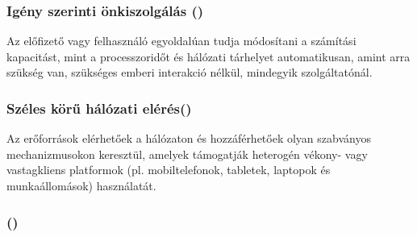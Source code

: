 \subsubsection{Igény szerinti önkiszolgálás ()}

Az előfizető vagy felhasználó egyoldalúan tudja módosítani a számítási kapacitást, mint a processzoridőt és hálózati tárhelyet automatikusan, amint arra szükség van, szükséges emberi interakció nélkül, mindegyik szolgáltatónál.

\subsubsection{Széles körű hálózati elérés()}

Az erőforrások elérhetőek a hálózaton és hozzáférhetőek olyan szabványos mechanizmusokon keresztül, amelyek támogatják heterogén vékony- vagy vastagkliens platformok (pl. mobiltelefonok, tabletek, laptopok és munkaállomások) használatát.

\subsubsection{()}

